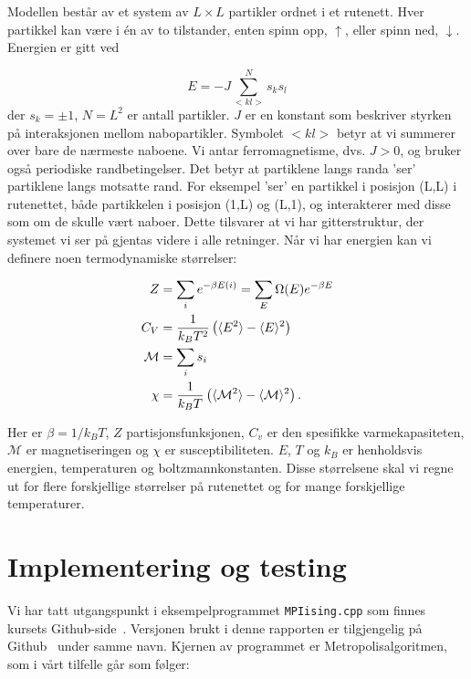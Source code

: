 \documentclass[11pt, twocolumn]{article}
\begin{document}
Modellen består av et system av $L \times L$ partikler ordnet i et rutenett. 
Hver partikkel kan være i én av to tilstander, enten spinn opp, $\uparrow$,
eller spinn ned, $\downarrow$. Energien er gitt ved 

\begin{equation}
  E=-J\sum_{<kl>}^{N}s_ks_l\label{eq:energi}
\end{equation}
der  $s_k=\pm 1$, $N = L^2$ er antall partikler.
$J$ er en konstant som beskriver styrken på interaksjonen mellom
nabopartikler. Symbolet $<kl>$ betyr at vi summerer over bare de
nærmeste naboene. Vi antar ferromagnetisme, dvs.  $J> 0$, og bruker også
periodiske randbetingelser. Det betyr at partiklene langs randa 'ser' 
partiklene langs motsatte rand. For eksempel 'ser' en partikkel i posisjon
(L,L) i rutenettet, både partikkelen i posisjon (1,L) og (L,1), og interakterer
med disse som om de skulle vært naboer. Dette tilsvarer at vi har
gitterstruktur, der systemet vi ser på gjentas videre i alle
retninger. Når vi har energien kan vi definere noen termodynamiske størrelser:

\begin{align}
Z &= \sum_i e^{-\beta E(i)} = \sum_E \Omega(E) e^{-\beta E}\label{eq:partisjons-funk} \\
C_V &= \frac{ 1 }{ k_B T^2} \left( \langle E^2 \rangle-\langle E \rangle^2 \right)\label{eq:spesifikk-varmekapasitet} \\
\mathcal{M} &= \sum_i s_i\label{eq:magnetisering} \\
\chi &= \frac{ 1 }{ k_BT } \left( \langle \mathcal{M}^2 \rangle - \langle \mathcal{M} \rangle^2 \right)\label{eq:susceptibilitet}.
\end{align}

Her er $\beta = 1/k_BT$, $Z$ partisjonsfunksjonen, $C_v$ er den spesifikke varmekapasiteten,
$\mathcal{M}$ er magnetiseringen og $\chi$ er susceptibiliteten. $E$, $T$ og $k_B$ er henholdsvis 
energien, temperaturen og boltzmannkonstanten. Disse størrelsene skal vi regne ut for flere forskjellige
størrelser på rutenettet og for mange forskjellige temperaturer.


\section{Implementering og testing}

Vi har tatt utgangspunkt i eksempelprogrammet \texttt{MPIising.cpp}
som finnes kursets Github-side~\cite{compphys-github}. Versjonen brukt
i denne rapporten er tilgjengelig på Github~\cite{github-repo} under samme navn. Kjernen av
programmet er Metropolisalgoritmen, som i vårt tilfelle går som følger: 
\end{document}
